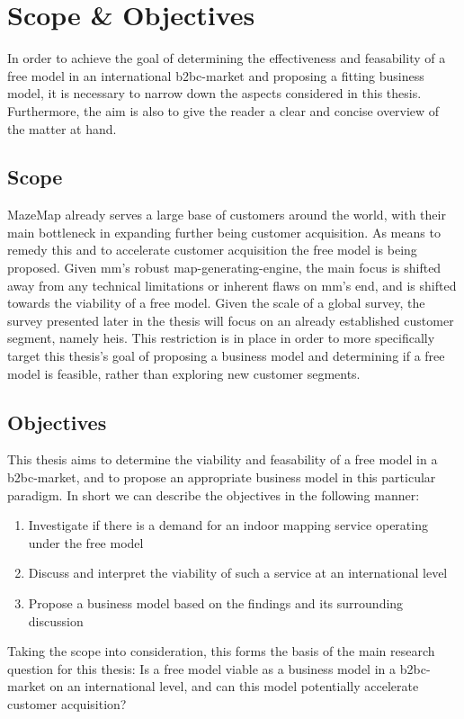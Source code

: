 \section{Scope \& Objectives}
In order to achieve the goal of determining the effectiveness and feasability of a free model in an international \gls{b2bc}-market and proposing a fitting business model, it is necessary to narrow down the aspects considered in this thesis. Furthermore, the aim is also to give the reader a clear and concise overview of the matter at hand.

\subsection{Scope}
MazeMap already serves a large base of customers around the world, with their main bottleneck in expanding further being customer acquisition. As means to remedy this and to accelerate customer acquisition the free model is being proposed. Given \gls{mm}'s robust map-generating-engine, the main focus is shifted away from any technical limitations or inherent flaws on \gls{mm}'s end, and is shifted towards the viability of a free model. Given the scale of a global survey, the survey presented later in the thesis will focus on an already established customer segment, namely \gls{hei}s. This restriction is in place in order to more specifically target this thesis's goal of proposing a business model and determining if a free model is feasible, rather than exploring new customer segments. 

\subsection{Objectives}
This thesis aims to determine the viability and feasability of a free model in a \gls{b2bc}-market, and to propose an appropriate business model in this particular paradigm. In short we can describe the objectives in the following manner:
\begin{enumerate}
    \item Investigate if there is a demand for an indoor mapping service operating under the free model 
    \item Discuss and interpret the viability of such a service at an international level
    \item Propose a business model based on the findings and its surrounding discussion
\end{enumerate}
Taking the scope into consideration, this forms the basis of the main research question for this thesis: Is a free model viable as a business model in a \gls{b2bc}-market on an international level, and can this model potentially accelerate customer acquisition?


